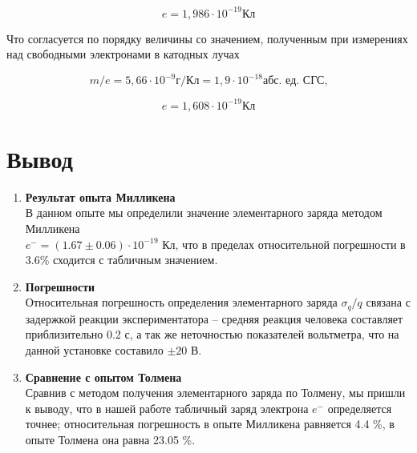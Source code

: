 \documentclass{lab}
\begin{document}
\begin{equation}
	e = 1,986\cdot 10^{-19} \text{Кл}
\end{equation}

Что согласуется по порядку величины со значением, полученным при измерениях над свободными электронами в катодных лучах

\begin{equation}
	m/e = 5,66 \cdot 10^{-9} \text{г/Кл}  = 1,9 \cdot 10^{-18} \text{абс. ед. СГС,}
\end{equation}

\begin{equation}
	e = 1,608\cdot 10^{-19} \text{Кл}
\end{equation}

\section{Вывод}
\begin{enumerate}
	\item \textbf{Результат опыта Милликена}
	      \\
	      В данном опыте мы определили значение элементарного заряда методом Милликена \\ $e^{-} = (1.67 \pm 0.06)\cdot10^{-19} \text{ Кл}$, что в пределах относительной погрешности в 3.6\% сходится с табличным значением.
	\item \textbf{Погрешности}
	      \\
	      Относительная погрешность определения элементарного заряда $\sigma_q/q$ связана с задержкой реакции экспериментатора -- средняя реакция человека составляет приблизительно 0.2 с, а так же неточностью показателей вольтметра, что на данной установке составило $\pm 20 \text{ В}$.
	\item \textbf{Сравнение с опытом Толмена}
	      \\
	      Сравнив с методом получения элементарного заряда по Толмену, мы пришли к выводу, что в нашей работе табличный заряд электрона $e^{-}$ определяется точнее; относительная погрешность в опыте Милликена равняется 4.4 \%, в опыте Толмена она равна 23.05 \%.
\end{enumerate}
\end{document}
